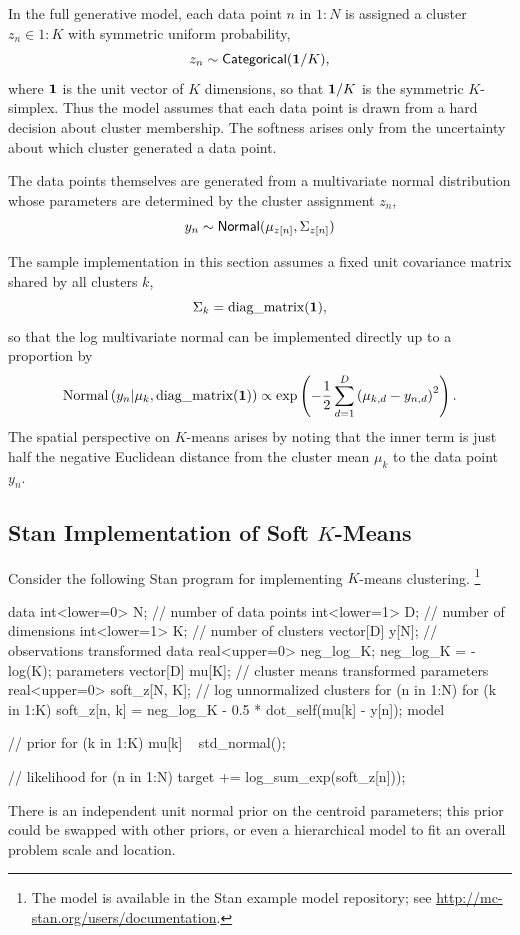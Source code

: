 In the full generative model, each data point $n$ in $1{:}N$ is assigned
a cluster $z_n \in 1{:}K$ with symmetric uniform probability,
%
\[
z_n \sim \mbox{\sf Categorical}({\bf 1}/K),
\]
where ${\bf 1}$ is the unit vector of $K$ dimensions, so that ${\bf
  1}/K$ is the symmetric $K$-simplex.  Thus the model assumes that
each data point is drawn from a hard decision about cluster
membership.  The softness arises only from the uncertainty about which
cluster generated a data point.

The data points themselves are generated from a multivariate normal
distribution whose parameters are determined by the cluster assignment
$z_n$,
\[
y_n \sim  \mbox{\sf Normal}(\mu_{z[n]},\Sigma_{z[n]})
\]

The sample implementation in this section assumes a fixed unit
covariance matrix shared by all clusters $k$,
\[
\Sigma_k = \mbox{diag\_matrix}({\bf 1}),
\]
so that the log multivariate normal can be implemented directly up to a proportion
by
\[
\mbox{Normal}\left( y_n | \mu_k, \mbox{diag\_matrix}({\bf 1}) \right)
\propto \exp \left (- \frac{1}{2} \sum_{d=1}^D \left( \mu_{k,d} - y_{n,d}
  \right)^2 \right).
\]
The spatial perspective on $K$-means arises by noting that the inner
term is just half the negative Euclidean distance from the cluster
mean $\mu_k$ to the data point $y_n$.

\subsection{Stan Implementation of Soft $K$-Means}

Consider the following Stan program for implementing $K$-means
clustering.%
%
\footnote{The model is available in the Stan example model repository;
see \url{http://mc-stan.org/users/documentation}.}
%
\begin{stancode}
data {
  int<lower=0> N;  // number of data points
  int<lower=1> D;  // number of dimensions
  int<lower=1> K;  // number of clusters
  vector[D] y[N];  // observations
}
transformed data {
  real<upper=0> neg_log_K;
  neg_log_K = -log(K);
}
parameters {
  vector[D] mu[K]; // cluster means
}
transformed parameters {
  real<upper=0> soft_z[N, K]; // log unnormalized clusters
  for (n in 1:N)
    for (k in 1:K)
      soft_z[n, k] = neg_log_K
                     - 0.5 * dot_self(mu[k] - y[n]);
}
model {
  // prior
  for (k in 1:K)
    mu[k] ~ std_normal();

  // likelihood
  for (n in 1:N)
    target += log_sum_exp(soft_z[n]));
}
\end{stancode}
%
There is an independent unit normal prior on the centroid parameters;
this prior could be swapped with other priors, or even a hierarchical
model to fit an overall problem scale and location.

